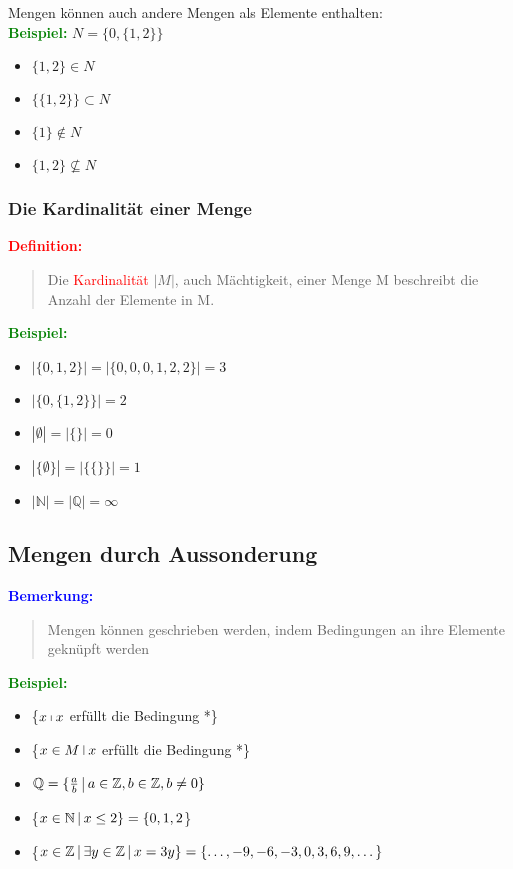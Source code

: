 \documentclass{article}
\newcommand{\smsp}{\phantom{\hspace{3px}}}
\newcommand{\red}[1]{\textcolor{red}{#1}}
\newcommand{\blue}[1]{\textcolor{blue}{#1}}
\newcommand{\green}[1]{\textcolor{green}{#1}}
\newcommand{\ex}{\green{\textbf{Beispiel: }}}
\newcommand{\de}[1]{\red{\textbf{Definition: }}\begin{quote}#1\end{quote}}
\newcommand{\an}[1]{\blue{\textbf{Bemerkung: }}\begin{quote}#1\end{quote}}
\newcommand{\N}{\mathbb{N}}
\newcommand{\Z}{\mathbb{Z}}
\newcommand{\Q}{\mathbb{Q}}
\newcommand{\vst}{\smsp \vline \smsp}
\begin{document}
Mengen können auch andere Mengen als Elemente enthalten:\\
\ex $N = \{0, \{1, 2\}\}$

\begin{itemize}
    \item $\{1, 2\} \in N$
    \item $\{\{1, 2\}\} \subset N$
    \item $\{1\} \notin N$
    \item $\{1, 2\} \nsubseteq N$
\end{itemize}

\subsubsection{Die Kardinalität einer Menge}

\de{Die \red{Kardinalität} $|M|$, auch Mächtigkeit, einer Menge M beschreibt die Anzahl der Elemente in M.}
    
\ex
\begin{itemize}
    \item $|\{0, 1, 2\}| = |\{0, 0, 0, 1, 2, 2\}| = 3$
    \item $|\{0, \{1, 2\}\}| = 2$
    \item $|\emptyset| = |\{\}| = 0$
    \item $|\{\emptyset\}| = |\{\{\}\}| = 1$
    \item $|\N| = |\Q| = \infty$
\end{itemize}

\subsection{Mengen durch Aussonderung}

\an{Mengen können geschrieben werden, indem Bedingungen an ihre Elemente geknüpft werden}

\ex
\begin{itemize}
    \item \{$x \vst x$ erfüllt die Bedingung *\}
    \item \{$x \in M \vst x$ erfüllt die Bedingung *\}
    \item $\Q = \{\frac{a}{b} \vst a \in \Z, b \in \Z, b \neq 0\}$
    \item \{$x \in \N \vst x \leq 2\} = \{0, 1, 2$\}
    \item \{$x \in \Z \vst \exists y \in \Z \vst x = 3y\} = \{\dots, -9, -6, -3, 0, 3, 6, 9, \dots\}$
\end{itemize}
\end{document}
